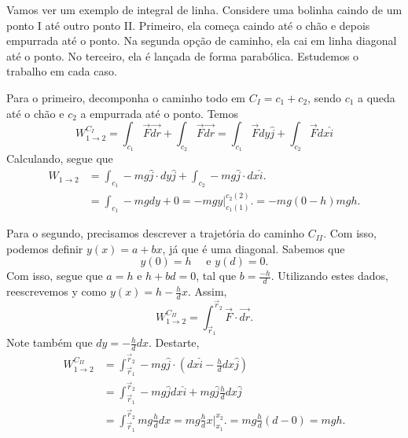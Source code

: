 \documentclass[PhysicsI/physics_notes.tex]{subfiles}
\begin{document}
\begin{example}
	Vamos ver um exemplo de integral de linha. Considere uma bolinha caindo de um ponto I até
	outro ponto II. Primeiro, ela começa caindo até o chão e depois empurrada até o ponto. Na segunda opção de caminho, ela cai em linha diagonal até o ponto. No terceiro,
	ela é lançada de forma parabólica. Estudemos o trabalho em cada caso.

	Para o primeiro, decomponha o caminho todo em \(C_{I} = c_{1} + c_{2}\), sendo
	\(c_{1}\) a queda até o chão e \(c_{2}\) a empurrada até o ponto. Temos
	\[
		W_{1\rightarrow 2 }^{C_{I}} = \int_{c_{1}}^{}\vec{F}\vec{dr} + \int_{c_{2}}^{}\vec{F}\vec{dr} = \int_{c_{1}}^{}\vec{F}dy \hat{j} + \int_{c_{2}}^{}\vec{F}dx \hat{i}
	\]
	Calculando, segue que
	\begin{align*}
		W_{1\rightarrow 2} & = \int_{c_{1}}^{}-mg \hat{j}\cdot dy \hat{j} + \int_{c_{2}}^{}-mg \hat{j}\cdot dx \hat{i}. \\
		                   & = \int_{c_{1}}^{}-mg dy + 0 = -mg y\biggl|_{c_{1}(1)}^{c_{2}(2)}\biggr. = -mg(0-h)mgh.
	\end{align*}

	Para o segundo, precisamos descrever a trajetória do caminho \(C_{II}\). Com isso,
	podemos definir \(y(x) = a + bx\), já que é uma diagonal. Sabemos que
	\[
		y(0) = h\quad\text{ e } y(d) = 0.
	\]
	Com isso, segue que \(a = h\) e \(h + bd = 0\), tal que \(b = \frac{-h}{d}.\) Utilizando estes dados,
	reescrevemos y como \(y(x) = h - \frac{h}{d}x\). Assim,
	\[
		W_{1\rightarrow 2}^{C_{II}} = \int_{\vec{r}_{1}}^{\vec{r}_{2}}\vec{F} \cdot \vec{dr}.
	\]
	Note também que \(dy = -\frac{h}{d}dx\). Destarte,
	\begin{align*}
		W_{1\rightarrow 2}^{C_{II}} & = \int_{\vec{r}_{1}}^{\vec{r}_{2}}-mg \hat{j}\cdot (dx \hat{i} - \frac{h}{d}dx \hat{j})                                           \\
		                            & = \int_{\vec{r}_{1}}^{\vec{r}_{2}}-mg \hat{j}dx \hat{i} + mg \hat{j}\frac{h}{d}dx \hat{j}                                         \\
		                            & = \int_{\vec{r}_{1}}^{\vec{r}_{2}}mg \frac{h}{d} dx = mg \frac{h}{d}x \biggl|_{x_{1}}^{x_{2}}\biggr. = mg \frac{h}{d}(d-0) = mgh.
	\end{align*}
\end{example}
\end{document}
